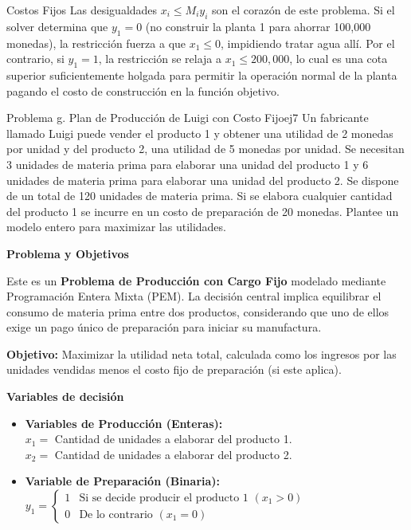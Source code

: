 \documentclass[10pt,a4paper]{article}
\begin{document}
\begin{nota}{Costos Fijos}
Las desigualdades $x_i \le M_i y_i$ son el corazón de este problema. Si el solver determina que $y_1 = 0$ (no construir la planta 1 para ahorrar 100,000 monedas), la restricción fuerza a que $x_1 \le 0$, impidiendo tratar agua allí. Por el contrario, si $y_1 = 1$, la restricción se relaja a $x_1 \le 200,000$, lo cual es una cota superior suficientemente holgada para permitir la operación normal de la planta pagando el costo de construcción en la función objetivo.
\end{nota}

\newpage

\begin{ejercicio}{Problema g. Plan de Producción de Luigi con Costo Fijo}{ej7}
Un fabricante llamado Luigi puede vender el producto 1 y obtener una utilidad de 2 monedas por unidad y del producto 2, una utilidad de 5 monedas por unidad. Se necesitan 3 unidades de materia prima para elaborar una unidad del producto 1 y 6 unidades de materia prima para elaborar una unidad del producto 2. Se dispone de un total de 120 unidades de materia prima. Si se elabora cualquier cantidad del producto 1 se incurre en un costo de preparación de 20 monedas. Plantee un modelo entero para maximizar las utilidades.
\end{ejercicio}

\vspace{3mm}
\textbf{Problema y Objetivos}

Este es un \textbf{Problema de Producción con Cargo Fijo} modelado mediante Programación Entera Mixta (PEM). La decisión central implica equilibrar el consumo de materia prima entre dos productos, considerando que uno de ellos exige un pago único de preparación para iniciar su manufactura.

\textbf{Objetivo:} Maximizar la utilidad neta total, calculada como los ingresos por las unidades vendidas menos el costo fijo de preparación (si este aplica).

\vspace{3mm}
\textbf{Variables de decisión}

\begin{itemize}
    \item \textbf{Variables de Producción (Enteras):} \\
    $x_1 = $ Cantidad de unidades a elaborar del producto 1. \\
    $x_2 = $ Cantidad de unidades a elaborar del producto 2.
    
    \item \textbf{Variable de Preparación (Binaria):} \\
    $y_1 = 
    \begin{cases} 
    1 & \text{Si se decide producir el producto 1 } (x_1 > 0) \\
    0 & \text{De lo contrario } (x_1 = 0)
    \end{cases}$
\end{itemize}
\end{document}
